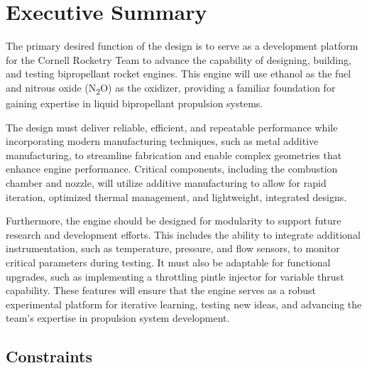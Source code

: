 



\section{Executive Summary}

The primary desired function of the design is to serve as a development platform for the Cornell Rocketry Team to advance the capability of designing, building, and testing bipropellant rocket engines. This engine will use ethanol as the fuel and nitrous oxide (N\textsubscript{2}O) as the oxidizer, providing a familiar foundation for gaining expertise in liquid bipropellant propulsion systems.

The design must deliver reliable, efficient, and repeatable performance while incorporating modern manufacturing techniques, such as metal additive manufacturing, to streamline fabrication and enable complex geometries that enhance engine performance. Critical components, including the combustion chamber and nozzle, will utilize additive manufacturing to allow for rapid iteration, optimized thermal management, and lightweight, integrated designs.

Furthermore, the engine should be designed for modularity to support future research and development efforts. This includes the ability to integrate additional instrumentation, such as temperature, pressure, and flow sensors, to monitor critical parameters during testing. It must also be adaptable for functional upgrades, such as implementing a throttling pintle injector for variable thrust capability. These features will ensure that the engine serves as a robust experimental platform for iterative learning, testing new ideas, and advancing the team's expertise in propulsion system development.

\subsection{Constraints}

